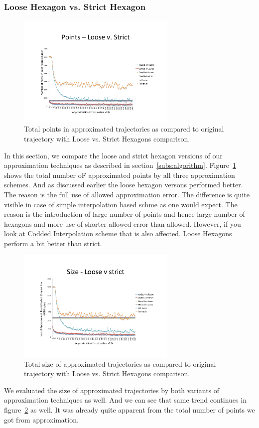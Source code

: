 \documentclass[conference]{IEEEtran}
\begin{document}
\subsubsection{Loose Hexagon vs. Strict Hexagon}
\begin{figure}[h]
  \centering
  \includegraphics[width=3in]{images/total-points-loose-v-strict.pdf}
  \caption {Total points in approximated trajectories as compared to original trajectory with Loose vs. Strict Hexagons comparison.}
  \label{fig:total-points-loose-strict}
  \end{figure}
In this section, we compare the loose and strict hexagon versions of our approximation techniques as described in section~\ref{subs:algorithm}. Figure~\ref{fig:total-points-loose-strict} shows the total number oF approximated points by all three approximation schemes. And as discussed earlier the loose hexagon versons performed better. The reason is the full use of allowed approximation error. The difference is quite visible in case of simple interpolation based schme as one would expect. The reason is the introduction of large number of points and hence large number of hexagons and more use of shorter allowed error than allowed. However, if you look at Codded Interpolation scheme that is also affected. Loose Hexagons perform a bit better than strict.
  
  \begin{figure}[h]
  \centering
  \includegraphics[width=3in]{images/total-size-loose-v-strict.pdf}
  \caption {Total size of approximated trajectories as compared to original trajectory with Loose vs. Strict Hexagons comparison.}
  \label{fig:total-storage-loose-strict}
  \end{figure}
  We evaluated the size of approximated trajectories by both variants of approximation techniques as well. And we can see that same trend continues in figure~\ref{fig:total-storage-loose-strict} as well. It was already quite apparent from the total number of points we got from approximation. 
\end{document}
